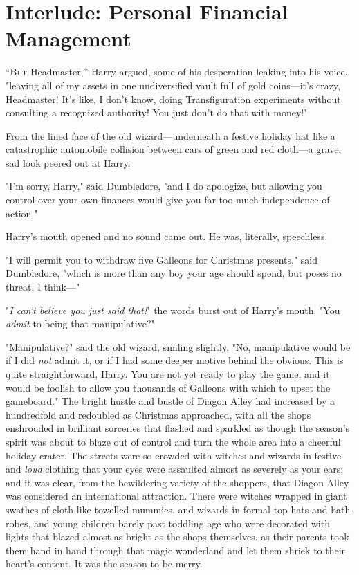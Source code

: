 \chapter{Interlude: Personal Financial Management}

\lettrine{“B}{ut} Headmaster,”
Harry argued, some of his desperation leaking into his voice, "leaving all of
my assets in one undiversified vault full of gold coins—it's crazy,
Headmaster! It's like, I don't know, doing Transfiguration experiments without
consulting a recognized authority! You just don't do that with money!"

From the lined face of the old wizard—underneath a festive holiday hat like a
catastrophic automobile collision between cars of green and red cloth—a
grave, sad look peered out at Harry.

"I'm sorry, Harry," said Dumbledore, "and I do apologize, but allowing you
control over your own finances would give you far too much independence of
action."

Harry's mouth opened and no sound came out. He was, literally, speechless.

"I will permit you to withdraw five Galleons for Christmas presents," said
Dumbledore, "which is more than any boy your age should spend, but poses no
threat, I think—"

"\emph{I can't believe you just said that!}" the words burst out of Harry's
mouth. "You \emph{admit} to being that manipulative?"

"Manipulative?" said the old wizard, smiling slightly. "No, manipulative would
be if I did \emph{not} admit it, or if I had some deeper motive behind the
obvious. This is quite straightforward, Harry. You are not yet ready to play
the game, and it would be foolish to allow you thousands of Galleons with which
to upset the gameboard."
\later
The bright hustle and bustle of Diagon Alley had increased by a hundredfold and
redoubled as Christmas approached, with all the shops enshrouded in brilliant
sorceries that flashed and sparkled as though the season's spirit was about to
blaze out of control and turn the whole area into a cheerful holiday crater.
The streets were so crowded with witches and wizards in festive and \emph{loud}
clothing that your eyes were assaulted almost as severely as your ears; and it
was clear, from the bewildering variety of the shoppers, that Diagon Alley was
considered an international attraction. There were witches wrapped in giant
swathes of cloth like towelled mummies, and wizards in formal top hats and
bath-robes, and young children barely past toddling age who were decorated with
lights that blazed almost as bright as the shops themselves, as their parents
took them hand in hand through that magic wonderland and let them shriek to
their heart's content. It was the season to be merry.

